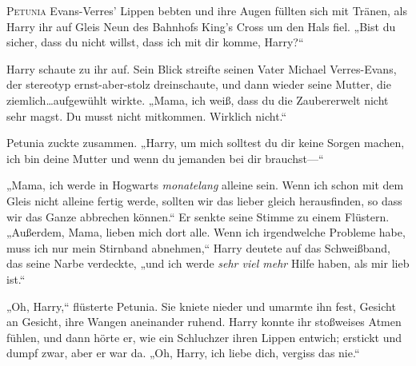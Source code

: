 \lettrine{P}{etunia} Evans-Verres' Lippen bebten und ihre Augen füllten sich mit Tränen, als Harry ihr auf Gleis Neun des Bahnhofs King's Cross um den Hals fiel. „Bist du sicher, dass du nicht willst, dass ich mit dir komme, Harry?“

Harry schaute zu ihr auf. Sein Blick streifte seinen Vater Michael Verres-Evans, der stereotyp ernst-aber-stolz dreinschaute, und dann wieder seine Mutter, die ziemlich…aufgewühlt wirkte. „Mama, ich weiß, dass du die Zaubererwelt nicht sehr magst. Du musst nicht mitkommen. Wirklich nicht.“

Petunia zuckte zusammen. „Harry, um mich solltest du dir keine Sorgen machen, ich bin deine Mutter und wenn du jemanden bei dir brauchst—“

„Mama, ich werde in Hogwarts \emph{monatelang} alleine sein. Wenn ich schon mit dem Gleis nicht alleine fertig werde, sollten wir das lieber gleich herausfinden, so dass wir das Ganze abbrechen können.“ Er senkte seine Stimme zu einem Flüstern. „Außerdem, Mama, lieben mich dort alle. Wenn ich irgendwelche Probleme habe, muss ich nur mein Stirnband abnehmen,“ Harry deutete auf das Schweißband, das seine Narbe verdeckte, „und ich werde \emph{sehr viel mehr} Hilfe haben, als mir lieb ist.“

„Oh, Harry,“ flüsterte Petunia. Sie kniete nieder und umarmte ihn fest, Gesicht an Gesicht, ihre Wangen aneinander ruhend. Harry konnte ihr stoßweises Atmen fühlen, und dann hörte er, wie ein Schluchzer ihren Lippen entwich; erstickt und dumpf zwar, aber er war da. „Oh, Harry, ich liebe dich, vergiss das nie.“

